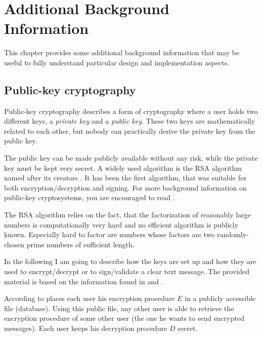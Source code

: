 \chapter{Additional Background Information}
\label{app:cha:background}

This chapter  provides some additional background information  that may be
useful to fully understand particular design and implementation aspects.

\section{Public-key cryptography}
\label{app:sec:public-key-cryptography}

Public-key  cryptography describes  a form  of cryptography  where  a user
holds  two  different  keys,  a  \emph{private  key}  and  a  \emph{public
  key}.  These two  keys are  mathematically  related to  each other,  but
nobody can practically derive the private key from the public key.

The public key can be made  publicly available without any risk, while the
private key must  be kept very secret. A widely used  algorithm is the RSA
algorithm named  after its  creators \citet*{rivest77method}. It  has been
the first algorithm, that  was suitable for both encryption/decryption and
signing.  For more background information on public-key cryptosystems, you
are encouraged to read \cite{rivest77method,diffie76new}.

The RSA algorithm relies on the fact, that the factorization of reasonably
large numbers is  computationally very hard and no  efficient algorithm is
publicly known.  Especially  hard to factor are numbers  whose factors are
two randomly-chosen prime numbers of sufficient length.

In the following  I am going to describe  how the keys are set  up and how
they  are  used  to  encrypt/decrypt  or to  sign/validate  a  clear  text
message.  The provided  material  is  based on  the  information found  in
\cite{rivest77method} and \cite{diffie76new}.

According  to  \cite{rivest77method}   places  each  user  his  encryption
procedure $E$  in a publicly  accessible file (\eg database).   Using this
public file, any  other user is able to  retrieve the encryption procedure
of some other user (\ie the one he wants to send encrypted messages). Each
user keeps his decryption procedure $D$ secret.

